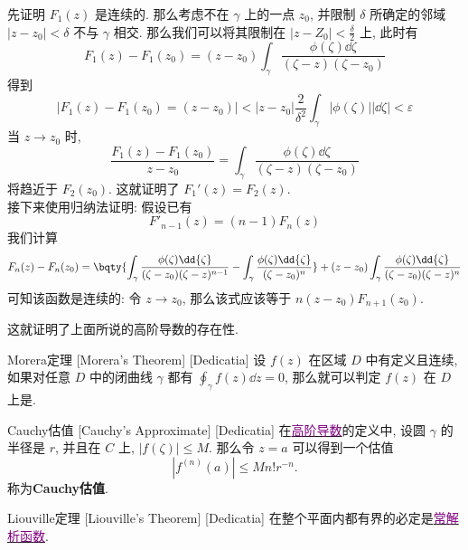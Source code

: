 \documentclass[UTF8]{ctexart}
\newcommand{\hyperrefc}[2]{\hyperref[#1]{\textcolor{purple}{#2}}}
\begin{document}
        \begin{prf}
            先证明 \(F_1(z)\) 是连续的. 那么考虑不在 \(\gamma\) 上的一点 \(z_0\), 并限制 \(\delta\) 所确定的邻域 \(|z-z_0|<\delta\) 不与 \(\gamma\) 相交. 那么我们可以将其限制在 \(|z-Z_0|<\frac{\delta}{2}\) 上, 此时有
            \[F_1(z)-F_1(z_0)=(z-z_0)\int_\gamma\frac{\phi(\zeta)\dd{\zeta}}{(\zeta-z)(\zeta-z_0)}\]
            得到
            \[|F_1(z)-F_1(z_0)=(z-z_0)|<|z-z_0|\frac{2}{\delta^2}\int_\gamma|\phi(\zeta)||\dd{\zeta}|<\varepsilon\]
            当 \(z\to z_0\) 时, 
            \[\frac{F_1(z)-F_1(z_0)}{z-z_0}=\int_\gamma\frac{\phi(\zeta)\dd{\zeta}}{(\zeta-z)(\zeta-z_0)}\]
            将趋近于 \(F_2(z_0)\). 这就证明了 \(F_1'(z)=F_2(z) \).\\
            接下来使用归纳法证明: 假设已有
            \[F'_{n-1}(z)=(n-1)F_n(z)\]
            我们计算
            \[F_n(z)-F_n(z_0)=\bqty{\int_\gamma\frac{\phi(\zeta)\dd{\zeta}}{(\zeta-z_0)(\zeta-z)^{n-1}}-\int_\gamma\frac{\phi(\zeta)\dd{\zeta}}{(\zeta-z_0)^n}}+(z-z_0)\int_\gamma\frac{\phi(\zeta)\dd{\zeta}}{(\zeta-z_0)(\zeta-z)^{n}}\]
            可知该函数是连续的: 令 \(z\to z_0\), 那么该式应该等于 \(n(z-z_0)F_{n+1}(z_0)\).
        \end{prf}

        这就证明了上面所说的高阶导数的存在性. 

        \begin{thm}
            [UUID]
            {Morera定理}
            [Morera's Theorem]
            [Dedicatia]
            设 \(f(z)\) 在区域 \(D\) 中有定义且连续, 如果对任意 \(D\) 中的闭曲线 \(\gamma\) 都有 \(\oint_\gamma f(z)\dd{z}=0\), 那么就可以判定 \(f(z)\) 在 \(D\) 上是.
        \end{thm}

        \begin{dfn}
            [UUID]
            {Cauchy估值}
            [Cauchy's Approximate]
            [Dedicatia]
            在\hyperrefc{dfn:HighOrderedDerivative}{高阶导数}的定义中, 设圆 \(\gamma\) 的半径是 \(r\), 并且在 \(C\) 上,  \(|f(\zeta)|\leqslant M\). 那么令 \(z=a\) 可以得到一个估值
            \[|f^{(n)}(a)|\leqslant Mn!r^{-n}.\]
            称为\textbf{Cauchy估值}.
        \end{dfn}

        \begin{thm}
            [Liouville]
            {Liouville定理}
            [Liouville's Theorem]
            [Dedicatia]
            在整个平面内都有界的 必定是\hyperrefc{ppt:TrivialAnalyticalFunction}{常解析函数}. 
        \end{thm}
\end{document}
